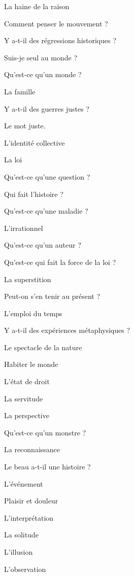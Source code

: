 \documentclass[a4paper,12pt]{article}
\begin{document}
\begin{multicols}{2}
\noindent La haine de la raison \par
\noindent Comment penser le mouvement ? \par
\noindent Y a-t-il des régressions historiques ? \par
\noindent Suis-je seul au monde ? \par
\noindent Qu’est-ce qu’un monde ? \par
\noindent La famille \par
\noindent Y a-t-il des guerres justes ? \par
\noindent Le mot juste. \par
\noindent L’identité collective \par
\noindent La loi \par
\noindent Qu’est-ce qu’une question ? \par
\noindent Qui fait l’histoire ? \par
\noindent Qu’est-ce qu’une maladie ? \par
\noindent L’irrationnel \par
\noindent Qu’est-ce qu’un auteur ? \par
\noindent Qu’est-ce qui fait la force de la loi ? \par
\noindent La superstition \par
\noindent Peut-on s’en tenir au présent ? \par
\noindent L’emploi du temps \par
\noindent Y a-t-il des expériences métaphysiques ? \par
\noindent Le spectacle de la nature \par
\noindent Habiter le monde \par
\noindent L’état de droit \par
\noindent La servitude \par
\noindent La perspective \par
\noindent Qu’est-ce qu’un monstre ? \par
\noindent La reconnaissance \par
\noindent Le beau a-t-il une histoire ? \par
\noindent L’événement \par
\noindent Plaisir et douleur \par
\noindent L’interprétation \par
\noindent La solitude \par
\noindent L’illusion \par
\noindent L’observation \par

\end{multicols}
\end{document}
